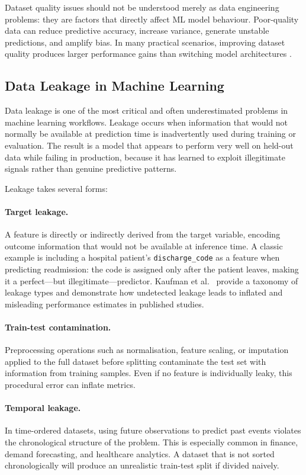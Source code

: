 \documentclass[12pt,a4paper]{report}
\begin{document}
Dataset quality issues should not be understood merely as data engineering problems: they are
factors that directly affect ML model behaviour.  Poor-quality data can reduce predictive
accuracy, increase variance, generate unstable predictions, and amplify bias.  In many
practical scenarios, improving dataset quality produces larger performance gains than
switching model architectures \cite{zha2023}.

\subsection{Data Leakage in Machine Learning}

Data leakage is one of the most critical and often underestimated problems in machine
learning workflows.  Leakage occurs when information that would not normally be available
at prediction time is inadvertently used during training or evaluation.  The result is a model
that appears to perform very well on held-out data while failing in production, because it
has learned to exploit illegitimate signals rather than genuine predictive patterns.

Leakage takes several forms:

\paragraph{Target leakage.} A feature is directly or indirectly derived from the target
variable, encoding outcome information that would not be available at inference time.  A
classic example is including a hospital patient's \texttt{discharge\_code} as a feature when
predicting readmission: the code is assigned only after the patient leaves, making it a
perfect---but illegitimate---predictor.  Kaufman et al.\ \cite{kaufman2012leakage} provide a
taxonomy of leakage types and demonstrate how undetected leakage leads to inflated and
misleading performance estimates in published studies.

\paragraph{Train-test contamination.} Preprocessing operations such as normalisation,
feature scaling, or imputation applied to the full dataset before splitting contaminate the
test set with information from training samples.  Even if no feature is individually leaky,
this procedural error can inflate metrics.

\paragraph{Temporal leakage.} In time-ordered datasets, using future observations to
predict past events violates the chronological structure of the problem.  This is especially
common in finance, demand forecasting, and healthcare analytics.  A dataset that is not
sorted chronologically will produce an unrealistic train-test split if divided naively.
\end{document}
